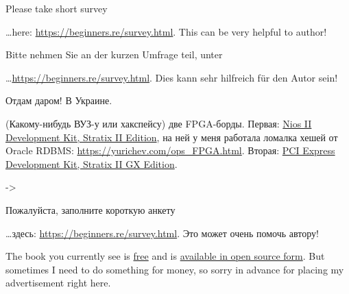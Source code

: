 \vspace*{\fill}

\ifdefined\ENGLISH

\huge
	Please take short survey
\normalsize

\bigskip
\bigskip
\bigskip

\dots here: \url{https://beginners.re/survey.html}.
This can be very helpful to author!

\fi %

\ifdefined\GERMAN

\huge
	Bitte nehmen Sie an der kurzen Umfrage teil, unter
\normalsize

\bigskip
\bigskip
\bigskip

\dots \url{https://beginners.re/survey.html}.
Dies kann sehr hilfreich für den Autor sein!

\fi %

\ifdefined\RUSSIAN

\huge
	Отдам даром! В Украине.
\normalsize

\bigskip
\bigskip
\bigskip

(Какому-нибудь ВУЗ-у или хакспейсу) две FPGA-борды.
Первая: \href{https://www.altera.com/products/boards_and_kits/dev-kits/altera/kit-niosii-2s60.html}{Nios II Development Kit, Stratix II Edition}, на ней у меня работала ломалка хешей от Oracle RDBMS:
\url{https://yurichev.com/ops_FPGA.html}.
Вторая: \href{https://www.altera.com/products/boards_and_kits/dev-kits/altera/kit-pciexpress_s2gx.html}{PCI Express Development Kit, Stratix II GX Edition}.

-> \EMAIL

\bigskip
\bigskip
\bigskip

\huge
	Пожалуйста, заполните короткую анкету
\normalsize

\bigskip
\bigskip
\bigskip

\dots здесь: \url{https://beginners.re/survey.html}.
Это может очень помочь автору!

\fi %

\ifdefined\ENGLISH

\bigskip
\bigskip
\bigskip

\huge
\normalsize

\bigskip
\bigskip
\bigskip


The book you currently see is \href{http://beginners.re/}{free} and is \href{https://github.com/dennis714/RE-for-beginners/}{available in open source form}.
But sometimes I need to do something for money, so sorry in advance for placing my advertisement right here.

